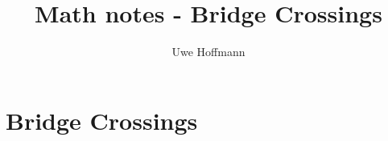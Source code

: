 

\title{Math notes - Bridge Crossings}
\author{Uwe Hoffmann}



\setcounter{chapter}{0}
\chapter{Bridge Crossings}
